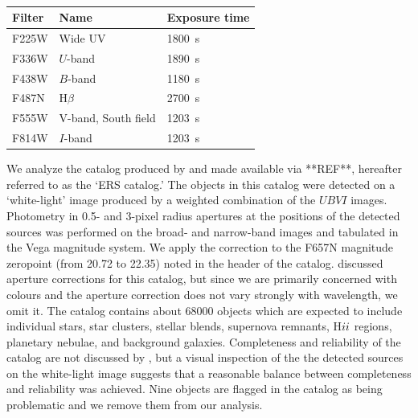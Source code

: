 \begin{table}
\centering
\caption{
\label{tab:filters}}
\begin{tabular}{lll}
\hline\hline
Filter & Name & Exposure time\\
\hline
F225W &  Wide UV & 1800~s\\
F336W &  $U$-band & 1890~s\\ 
F438W &  $B$-band & 1180~s\\
F487N &  H$\beta$ & 2700~s\\
F555W &  V-band, South field & 1203~s\\
F814W &  $I$-band & 1203~s\\
\hline
\end{tabular}
\end{table}

We analyze the catalog produced by \citet{chandar10} and made available via **REF**, hereafter referred to as the `ERS catalog.'
The objects in this catalog were detected on a `white-light' image produced by a weighted combination of the $UBVI$ images.
Photometry in 0.5- and 3-pixel radius apertures at the positions of the detected sources was performed on the broad- and narrow-band images and tabulated in the Vega magnitude system. 
We apply the correction to the F657N magnitude zeropoint (from 20.72 to 22.35) noted in the header of the catalog.
\citet{chandar10} discussed aperture corrections for this catalog, but since we are primarily concerned with colours
and the aperture correction does not vary strongly with wavelength, we omit it.
The catalog contains about 68000 objects which are expected to include individual stars, star clusters, stellar blends,
supernova remnants, H${\sc ii}$ regions, planetary nebulae, and background galaxies.
Completeness and reliability of the catalog are not discussed by \citet{chandar10},
but a visual inspection of the the detected sources on the white-light image suggests that a reasonable balance
between completeness and reliability was achieved.
Nine objects are flagged in the catalog as being problematic 
and we remove them from our analysis.

